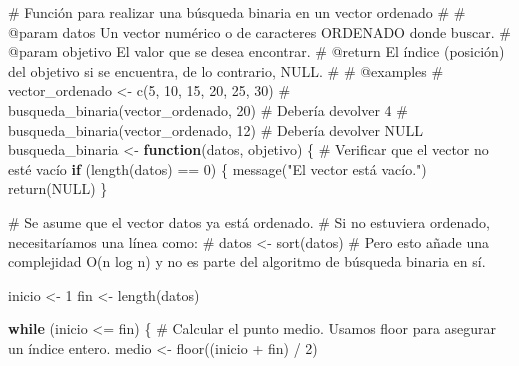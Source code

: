 \documentclass[
  spanish,
  letterpaper,
  DIV=11,
  numbers=noendperiod]{scrreprt}
\newenvironment{Shaded}{\begin{snugshade}}{\end{snugshade}}
\newcommand{\CommentTok}[1]{\textcolor[rgb]{0.37,0.37,0.37}{#1}}
\newcommand{\ConstantTok}[1]{\textcolor[rgb]{0.56,0.35,0.01}{#1}}
\newcommand{\ControlFlowTok}[1]{\textcolor[rgb]{0.00,0.23,0.31}{\textbf{#1}}}
\newcommand{\DecValTok}[1]{\textcolor[rgb]{0.68,0.00,0.00}{#1}}
\newcommand{\FunctionTok}[1]{\textcolor[rgb]{0.28,0.35,0.67}{#1}}
\newcommand{\NormalTok}[1]{\textcolor[rgb]{0.00,0.23,0.31}{#1}}
\newcommand{\OtherTok}[1]{\textcolor[rgb]{0.00,0.23,0.31}{#1}}
\newcommand{\SpecialCharTok}[1]{\textcolor[rgb]{0.37,0.37,0.37}{#1}}
\newcommand{\StringTok}[1]{\textcolor[rgb]{0.13,0.47,0.30}{#1}}
\begin{document}
\begin{Shaded}
\begin{Highlighting}[]
\CommentTok{\#\textquotesingle{} Función para realizar una búsqueda binaria en un vector ordenado}
\CommentTok{\#\textquotesingle{}}
\CommentTok{\#\textquotesingle{} @param datos Un vector numérico o de caracteres ORDENADO donde buscar.}
\CommentTok{\#\textquotesingle{} @param objetivo El valor que se desea encontrar.}
\CommentTok{\#\textquotesingle{} @return El índice (posición) del objetivo si se encuentra, de lo contrario, NULL.}
\CommentTok{\#\textquotesingle{}}
\CommentTok{\#\textquotesingle{} @examples}
\CommentTok{\#\textquotesingle{} vector\_ordenado \textless{}{-} c(5, 10, 15, 20, 25, 30)}
\CommentTok{\#\textquotesingle{} busqueda\_binaria(vector\_ordenado, 20) \# Debería devolver 4}
\CommentTok{\#\textquotesingle{} busqueda\_binaria(vector\_ordenado, 12) \# Debería devolver NULL}
\NormalTok{busqueda\_binaria }\OtherTok{\textless{}{-}} \ControlFlowTok{function}\NormalTok{(datos, objetivo) \{}
  \CommentTok{\# Verificar que el vector no esté vacío}
  \ControlFlowTok{if}\NormalTok{ (}\FunctionTok{length}\NormalTok{(datos) }\SpecialCharTok{==} \DecValTok{0}\NormalTok{) \{}
    \FunctionTok{message}\NormalTok{(}\StringTok{"El vector está vacío."}\NormalTok{)}
    \FunctionTok{return}\NormalTok{(}\ConstantTok{NULL}\NormalTok{)}
\NormalTok{  \}}

  \CommentTok{\# Se asume que el vector \textquotesingle{}datos\textquotesingle{} ya está ordenado.}
  \CommentTok{\# Si no estuviera ordenado, necesitaríamos una línea como:}
  \CommentTok{\# datos \textless{}{-} sort(datos)}
  \CommentTok{\# Pero esto añade una complejidad O(n log n) y no es parte del algoritmo de búsqueda binaria en sí.}

\NormalTok{  inicio }\OtherTok{\textless{}{-}} \DecValTok{1}
\NormalTok{  fin }\OtherTok{\textless{}{-}} \FunctionTok{length}\NormalTok{(datos)}

  \ControlFlowTok{while}\NormalTok{ (inicio }\SpecialCharTok{\textless{}=}\NormalTok{ fin) \{}
    \CommentTok{\# Calcular el punto medio. Usamos floor para asegurar un índice entero.}
\NormalTok{    medio }\OtherTok{\textless{}{-}} \FunctionTok{floor}\NormalTok{((inicio }\SpecialCharTok{+}\NormalTok{ fin) }\SpecialCharTok{/} \DecValTok{2}\NormalTok{)}


\end{Highlighting}
\end{Shaded}
\end{document}
